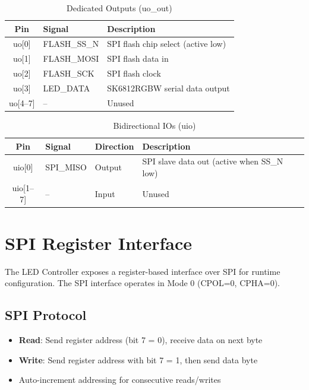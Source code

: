 \documentclass[11pt,a4paper]{article}
\begin{document}
\begin{table}[H]
\centering
\caption{Dedicated Outputs (uo\_out)}
\begin{tabular}{@{}clp{6cm}@{}}
\toprule
\textbf{Pin} & \textbf{Signal} & \textbf{Description} \\
\midrule
uo[0] & FLASH\_SS\_N & SPI flash chip select (active low) \\
uo[1] & FLASH\_MOSI & SPI flash data in \\
uo[2] & FLASH\_SCK & SPI flash clock \\
uo[3] & LED\_DATA & SK6812RGBW serial data output \\
uo[4--7] & -- & Unused \\
\bottomrule
\end{tabular}
\end{table}

\begin{table}[H]
\centering
\caption{Bidirectional IOs (uio)}
\begin{tabular}{@{}cllp{5cm}@{}}
\toprule
\textbf{Pin} & \textbf{Signal} & \textbf{Direction} & \textbf{Description} \\
\midrule
uio[0] & SPI\_MISO & Output & SPI slave data out (active when SS\_N low) \\
uio[1--7] & -- & Input & Unused \\
\bottomrule
\end{tabular}
\end{table}

\section{SPI Register Interface}

The LED Controller exposes a register-based interface over SPI for runtime configuration. The SPI interface operates in Mode 0 (CPOL=0, CPHA=0).

\subsection{SPI Protocol}

\begin{itemize}[noitemsep]
    \item \textbf{Read}: Send register address (bit 7 = 0), receive data on next byte
    \item \textbf{Write}: Send register address with bit 7 = 1, then send data byte
    \item Auto-increment addressing for consecutive reads/writes
\end{itemize}
\end{document}
